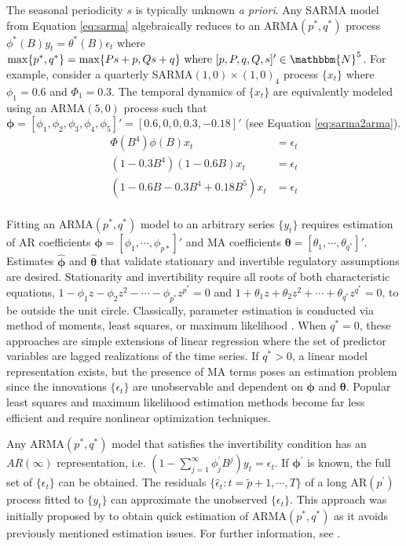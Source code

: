 The seasonal periodicity $s$ is typically unknown \textit{a priori}. Any SARMA model from Equation \ref{eq:sarma} algebraically reduces to an ARMA$(p^*,q^*)$ process $\phi^*(B)y_t=\theta^*(B)\epsilon_t$ where $\max\{p^*,q^*\}=\max\{Ps+p,Qs+q\} \textrm{ where } [p,P,q,Q,s]'\in\mathbbm{N}^5$. For example, consider a quarterly SARMA$(1,0)\times(1,0)_{4}$ process $\{x_t\}$ where $\phi_1=0.6$ and $\Phi_1=0.3$. The temporal dynamics of $\{x_t\}$ are equivalently modeled using an ARMA$(5,0)$ process such that $\bm{\phi}=[\phi_1,\phi_2,\phi_3,\phi_4,\phi_5]'=[0.6,0,0,0.3,-0.18]'$ (see Equation \ref{eq:sarma2arma}).
\begin{equation}
\label{eq:sarma2arma}
\begin{split}
\Phi(B^4)\phi(B)x_t&=\epsilon_t\\
(1-0.3B^4)(1-0.6B)x_t&=\epsilon_t\\
(1-0.6B-0.3B^4+0.18B^5)x_t&=\epsilon_t\\
\end{split}
\end{equation}

Fitting an ARMA$(p^*,q^*)$ model to an arbitrary series $\{y_t\}$ requires estimation of AR coefficients $\bm{\phi}=[\phi_1,\cdots,\phi_{p*}]'$ and MA coefficients $\bm{\theta}=[\theta_1,\cdots,\theta_{q^*}]'$. Estimates $\hat{\bm{\phi} }$ and $\hat{\bm{\theta} }$ that validate stationary and invertible regulatory assumptions are desired. Stationarity and invertibility require all roots of both characteristic equations, $1-\phi_1z-\phi_2z^2-\cdots -\phi_{p^*}z^{p^*}=0$ and $1+\theta_1z+\theta_2z^2+\cdots +\theta_{q^*}z^{q^*}=0$, to be outside the unit circle. Classically, parameter estimation is conducted via method of moments, least squares, or maximum likelihood \citep{Hamilton1994, Cryer2008}. When $q^*=0$, these approaches are simple extensions of linear regression where the set of predictor variables are lagged realizations of the time series. If $q^*>0$, a linear model representation exists, but the presence of MA terms poses an estimation problem since the innovations $\{\epsilon_t\}$ are unobservable and dependent on $\bm{\phi}$ and $\bm{\theta}$. Popular least squares and maximum likelihood estimation methods become far less efficient and require nonlinear optimization techniques.

Any ARMA$(p^*,q^*)$ model that satisfies the invertibility condition has an $AR(\infty)$ representation, i.e. $(1-\sum\limits_{j=1}^\infty \phi^\prime_jB^j)y_t=\epsilon_t$. If $\bm{\phi}^\prime$ is known, the full set of $\{\epsilon_t\}$ can be obtained. The residuals $\{\hat{\epsilon}_t: t=\tilde{p}+1,\cdots,T\}$ of a long AR$(p^\prime)$ process fitted to  $\{y_t\}$ can approximate the unobserved $\{\epsilon_t\}$.  This approach was initially proposed by \cite{Hannan1982} to obtain quick estimation of ARMA$(p^*,q^*)$ as it avoids previously mentioned estimation issues. For further information, see \citet[pp. 156-158]{Brockwell2016}.

